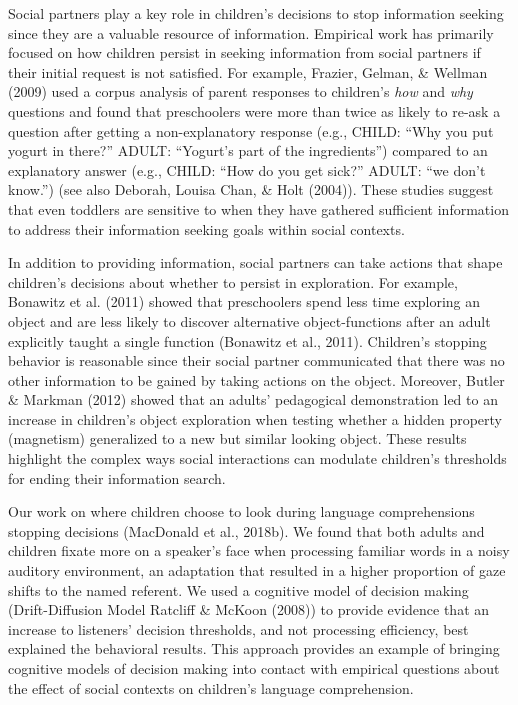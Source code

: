 \documentclass[oneside]{report}
\begin{document}
Social partners play a key role in children's decisions to stop
information seeking since they are a valuable resource of information.
Empirical work has primarily focused on how children persist in seeking
information from social partners if their initial request is not
satisfied. For example, Frazier, Gelman, \& Wellman (2009) used a corpus
analysis of parent responses to children's \emph{how} and \emph{why}
questions and found that preschoolers were more than twice as likely to
re-ask a question after getting a non-explanatory response (e.g., CHILD:
``Why you put yogurt in there?'' ADULT: ``Yogurt's part of the
ingredients'') compared to an explanatory answer (e.g., CHILD: ``How do
you get sick?'' ADULT: ``we don't know.'') (see also Deborah, Louisa
Chan, \& Holt (2004)). These studies suggest that even toddlers are
sensitive to when they have gathered sufficient information to address
their information seeking goals within social contexts.

In addition to providing information, social partners can take actions
that shape children's decisions about whether to persist in exploration.
For example, Bonawitz et al. (2011) showed that preschoolers spend less
time exploring an object and are less likely to discover alternative
object-functions after an adult explicitly taught a single function
(Bonawitz et al., 2011). Children's stopping behavior is reasonable
since their social partner communicated that there was no other
information to be gained by taking actions on the object. Moreover,
Butler \& Markman (2012) showed that an adults' pedagogical
demonstration led to an increase in children's object exploration when
testing whether a hidden property (magnetism) generalized to a new but
similar looking object. These results highlight the complex ways social
interactions can modulate children's thresholds for ending their
information search.

Our work on where children choose to look during language comprehensions
stopping decisions (MacDonald et al., 2018b). We found that both adults
and children fixate more on a speaker's face when processing familiar
words in a noisy auditory environment, an adaptation that resulted in a
higher proportion of gaze shifts to the named referent. We used a
cognitive model of decision making (Drift-Diffusion Model Ratcliff \&
McKoon (2008)) to provide evidence that an increase to listeners'
decision thresholds, and not processing efficiency, best explained the
behavioral results. This approach provides an example of bringing
cognitive models of decision making into contact with empirical
questions about the effect of social contexts on children's language
comprehension.
\end{document}
